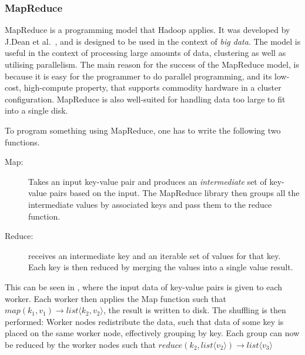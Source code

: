 \subsubsection{MapReduce}\label{sec:mapreduce_programming_model}
MapReduce is a programming model that Hadoop applies. It was developed by J.\@ Dean et al.~\cite{DeanMapReduce}, and is designed to be used in the context of \emph{big data}. The model is useful in the context of processing large amounts of data, clustering as well as utilising parallelism. The main reason for the success of the MapReduce model, is because it is easy for the programmer to do parallel programming, and its low-cost, high-compute property, that supports commodity hardware in a cluster configuration. MapReduce is also well-suited for handling data too large to fit into a single disk.

To program something using MapReduce, one has to write the following two functions. 
\begin{description}
\item[Map:] Takes an input key-value pair and produces an \emph{intermediate} set of key-value pairs based on the input. The MapReduce library then groups all the intermediate values by associated keys and pass them to the reduce function. 

\item[Reduce:] receives an intermediate key and an iterable set of values for that key. Each key is then reduced by merging the values into a single value result.
\end{description}

This can be seen in , where the input data of key-value pairs is given to each worker. Each worker then applies the Map function such that $map(k_1,v_1)\rightarrow list\langle k_2,v_2\rangle$, the result is written to disk. The shuffling is then performed: Worker nodes redistribute the data, such that data of some key is placed on the same worker node, effectively grouping by key. Each group can now be reduced by the worker nodes such that $reduce(k_2, list\langle v_2\rangle) \rightarrow list\langle v_3 \rangle$ 


